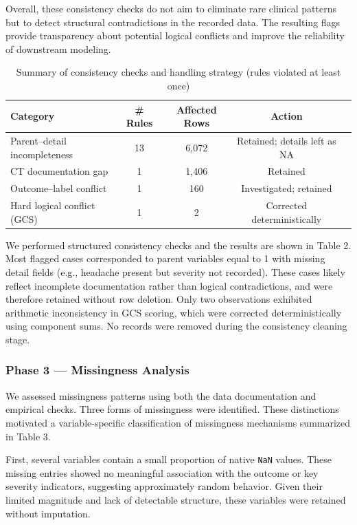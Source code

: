 \documentclass[11pt,letterpaper]{article}
\begin{document}
Overall, these consistency checks do not aim to eliminate rare clinical patterns but to detect structural contradictions in the recorded data. The resulting flags provide transparency about potential logical conflicts and improve the reliability of downstream modeling.

\begin{table}[ht]
\centering
\caption{Summary of consistency checks and handling strategy (rules violated at least once)}
\begin{tabular}{lcccc}
\toprule
\textbf{Category} & \textbf{\# Rules} & \textbf{Affected Rows} & \textbf{Action} \\
\midrule
Parent--detail incompleteness & 13 & 6,072 & Retained; details left as NA \\
CT documentation gap & 1 & 1,406 & Retained \\
Outcome--label conflict & 1 & 160  & Investigated; retained \\
Hard logical conflict (GCS) & 1 & 2  & Corrected deterministically \\
\bottomrule
\end{tabular}
\end{table}

We performed structured consistency checks and the results are shown in Table 2. 
Most flagged cases corresponded to parent variables equal to 1 with
missing detail fields (e.g., headache present but severity not recorded).
These cases likely reflect incomplete documentation rather than logical
contradictions, and were therefore retained without row deletion.
Only two observations exhibited arithmetic inconsistency in GCS scoring,
which were corrected deterministically using component sums.
No records were removed during the consistency cleaning stage.

\subsubsection{Phase 3 — Missingness Analysis}\label{Phase 3 — Missingness Analysis}

We assessed missingness patterns using both the data documentation and empirical checks. Three forms of missingness were identified. These distinctions motivated a variable-specific classification of missingness mechanisms summarized in Table 3.

First, several variables contain a small proportion of native \texttt{NaN} values. These missing entries showed no meaningful association with the outcome or key severity indicators, suggesting approximately random behavior. Given their limited magnitude and lack of detectable structure, these variables were retained without imputation.
\end{document}
